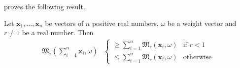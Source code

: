 \documentclass[inequalities.tex]{subfile}
\begin{document}
	\textcite[Page $115-117$]{minkowski_1968} proves the following result.
		\begin{theorem}\label{thm:mink}
			Let $\mathbf{x}_{1},\ldots,\mathbf{x}_{n}$ be vectors of $n$ positive real numbers, $\omega$ be a weight vector and $r\neq1$ be a real number. Then
				\begin{align*}
					\mathfrak{M}_{r}\left(\sum_{i=1}^{n}\mathbf{x}_{i},\omega\right)
						&
							\begin{cases}
								\geq \sum_{i=1}^{n}\mathfrak{M}_{r}(\mathbf{x}_{i},\omega)& \mbox{if }r<1\\
								\leq \sum_{i=1}^{n}\mathfrak{M}_{r}(\mathbf{x}_{i}, \omega)& \mbox{otherwise}
							\end{cases}
				\end{align*}
		\end{theorem}
\end{document}
